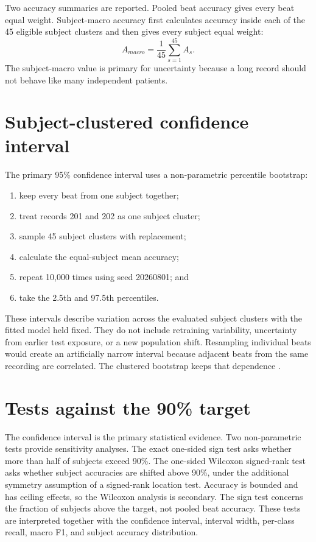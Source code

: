 Two accuracy summaries are reported. Pooled beat accuracy gives every beat
equal weight. Subject-macro accuracy first calculates accuracy inside each of
the 45 eligible subject clusters and then gives every subject equal weight:
\begin{equation}
 A_{macro}=\frac{1}{45}\sum_{s=1}^{45}A_s.
 \label{eq:subject-macro}
\end{equation}
The subject-macro value is primary for uncertainty because a long record should
not behave like many independent patients.

\section{Subject-clustered confidence interval}

The primary 95\% confidence interval uses a non-parametric percentile
bootstrap:
\begin{enumerate}
    \item keep every beat from one subject together;
    \item treat records 201 and 202 as one subject cluster;
    \item sample 45 subject clusters with replacement;
    \item calculate the equal-subject mean accuracy;
    \item repeat 10,000 times using seed 20260801; and
    \item take the 2.5th and 97.5th percentiles.
\end{enumerate}
These intervals describe variation across the evaluated subject clusters with
the fitted model held fixed. They do not include retraining variability,
uncertainty from earlier test exposure, or a new population shift.
Resampling individual beats would create an artificially narrow interval
because adjacent beats from the same recording are correlated. The clustered
bootstrap keeps that dependence \cite{rutter2000clustered}.

\section{Tests against the 90\% target}

The confidence interval is the primary statistical evidence. Two
non-parametric tests provide sensitivity analyses. The exact one-sided sign
test asks whether more than half of subjects exceed 90\%. The one-sided
Wilcoxon signed-rank test asks whether subject accuracies are shifted above
90\%, under the additional symmetry assumption of a signed-rank location
test. Accuracy is bounded and has ceiling effects, so the Wilcoxon analysis is
secondary. The sign test concerns the fraction of subjects above the target,
not pooled beat accuracy. These tests are interpreted together with the confidence interval,
interval width, per-class recall, macro F1, and subject accuracy distribution.

